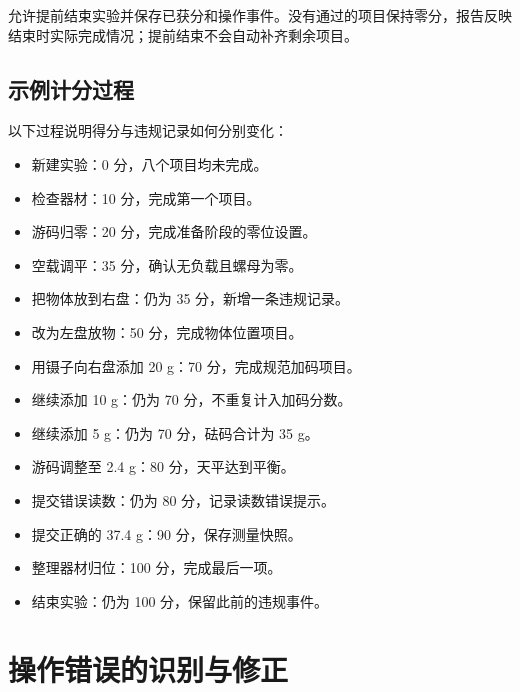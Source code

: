 \documentclass[UTF8,fontset=windows,zihao=-4]{ctexart}
\begin{document}
允许提前结束实验并保存已获分和操作事件。没有通过的项目保持零分，报告反映结束时实际完成情况；提前结束不会自动补齐剩余项目。

\subsection{示例计分过程}

以下过程说明得分与违规记录如何分别变化：

\begin{itemize}

\item 新建实验：0 分，八个项目均未完成。

\item 检查器材：10 分，完成第一个项目。

\item 游码归零：20 分，完成准备阶段的零位设置。

\item 空载调平：35 分，确认无负载且螺母为零。

\item 把物体放到右盘：仍为 35 分，新增一条违规记录。

\item 改为左盘放物：50 分，完成物体位置项目。

\item 用镊子向右盘添加 20 g：70 分，完成规范加码项目。

\item 继续添加 10 g：仍为 70 分，不重复计入加码分数。

\item 继续添加 5 g：仍为 70 分，砝码合计为 35 g。

\item 游码调整至 2.4 g：80 分，天平达到平衡。

\item 提交错误读数：仍为 80 分，记录读数错误提示。

\item 提交正确的 37.4 g：90 分，保存测量快照。

\item 整理器材归位：100 分，完成最后一项。

\item 结束实验：仍为 100 分，保留此前的违规事件。

\end{itemize}

\section{操作错误的识别与修正}
\end{document}
